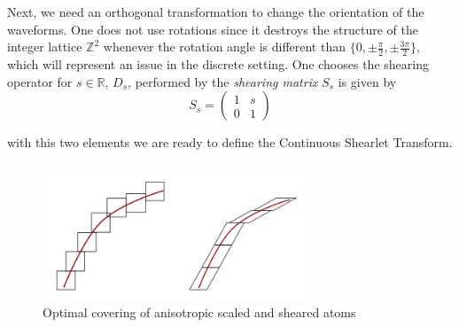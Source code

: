 \bigskip

 Next, we need an orthogonal transformation to change the orientation of the waveforms. One does not use rotations since it destroys the structure of the integer lattice $\mathbb{Z}^2$ whenever the rotation angle is different than $\{0,\pm\frac{\pi}{2},\pm\frac{3\pi}{2}\}$, which will represent an issue in the discrete setting. One chooses the shearing operator for $s\in\mathbb{R}$, $D_s$, performed by the \textit{shearing matrix} $S_s$ is given by 
\begin{equation}
\label{eq:shearing}
S_s=
\left(
\begin{matrix}
1 & s \\
0 & 1
\end{matrix}
\right)
\end{equation}

with this two elements we are ready to define the Continuous Shearlet Transform.

\begin{figure}[h!]
\centering
\includegraphics[width = 0.7\textwidth]{./Diagrams/anisotropic_isotropic.jpg}
\caption{Optimal covering of anisotropic scaled and sheared atoms}
\label{edges-images}
\end{figure}

